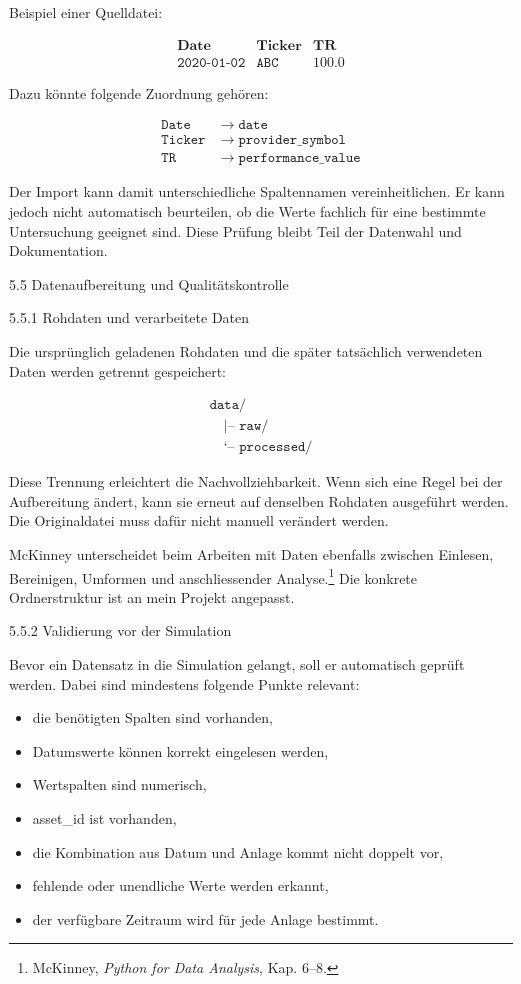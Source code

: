 \documentclass[
  ngerman,
  a4paper,
  DIV=11,
  oneside]{scrreprt}
\providecommand{\tightlist}{%
  \setlength{\itemsep}{0pt}\setlength{\parskip}{0pt}}
\begin{document}
Beispiel einer Quelldatei:

\[
\begin{array}{c|c|c}
\textbf{Date} & \textbf{Ticker} & \textbf{TR} \\
\hline
\texttt{2020-01-02} & \texttt{ABC} & 100.0
\end{array}
\]

Dazu könnte folgende Zuordnung gehören:

\[
\begin{aligned}
\texttt{Date}   &\;\longrightarrow\; \texttt{date} \\
\texttt{Ticker} &\;\longrightarrow\; \texttt{provider\_symbol} \\
\texttt{TR}     &\;\longrightarrow\; \texttt{performance\_value}
\end{aligned}
\]

Der Import kann damit unterschiedliche Spaltennamen vereinheitlichen. Er
kann jedoch nicht automatisch beurteilen, ob die Werte fachlich für eine
bestimmte Untersuchung geeignet sind. Diese Prüfung bleibt Teil der
Datenwahl und Dokumentation.

5.5 Datenaufbereitung und Qualitätskontrolle

5.5.1 Rohdaten und verarbeitete Daten

Die ursprünglich geladenen Rohdaten und die später tatsächlich
verwendeten Daten werden getrennt gespeichert:

\[
\begin{array}{l}
\texttt{data/} \\
\quad \texttt{|-- raw/} \\
\quad \texttt{`-- processed/}
\end{array}
\]

Diese Trennung erleichtert die Nachvollziehbarkeit. Wenn sich eine Regel
bei der Aufbereitung ändert, kann sie erneut auf denselben Rohdaten
ausgeführt werden. Die Originaldatei muss dafür nicht manuell verändert
werden.

McKinney unterscheidet beim Arbeiten mit Daten ebenfalls zwischen
Einlesen, Bereinigen, Umformen und anschliessender Analyse.\footnote{McKinney,
  \emph{Python for Data Analysis}, Kap. 6--8.} Die konkrete
Ordnerstruktur ist an mein Projekt angepasst.

5.5.2 Validierung vor der Simulation

Bevor ein Datensatz in die Simulation gelangt, soll er automatisch
geprüft werden. Dabei sind mindestens folgende Punkte relevant:

\begin{itemize}
\tightlist
\item
  die benötigten Spalten sind vorhanden,
\item
  Datumswerte können korrekt eingelesen werden,
\item
  Wertspalten sind numerisch,
\item
  asset\_id ist vorhanden,
\item
  die Kombination aus Datum und Anlage kommt nicht doppelt vor,
\item
  fehlende oder unendliche Werte werden erkannt,
\item
  der verfügbare Zeitraum wird für jede Anlage bestimmt.
\end{itemize}
\end{document}
